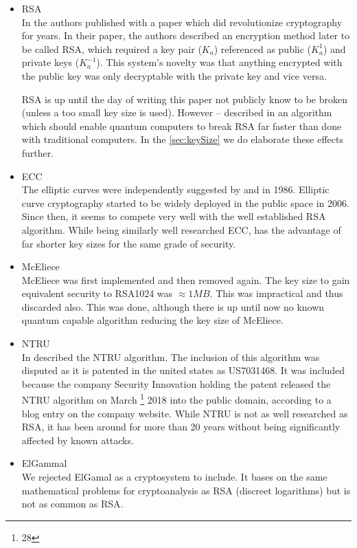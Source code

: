 \begin{itemize}
	\item RSA\\
	In \citeyear{Rivest:1978:MOD:359340.359342} the authors \citeauthor{Rivest:1978:MOD:359340.359342} published with \cite{Rivest:1978:MOD:359340.359342} a paper which did revolutionize cryptography for years. In their paper, the authors described an encryption method later to be called RSA, which required a key pair ($K_a$) referenced as public ($K^{1}_a$) and private keys ($K^{-1}_a$). This system's novelty was that anything encrypted with the public key was only decryptable with the private key and vice versa.
	
	RSA is up until the day of writing this paper not publicly know to be broken (unless a too small key size is used). However -- \citeauthor{Shor97polynomial-timealgorithms} described in \citeyear{Shor97polynomial-timealgorithms} an algorithm which should enable quantum computers to break RSA far faster than done with traditional computers. In the \cref{sec:keySize} we do elaborate these effects further.
	\item ECC\\
	The elliptic curves were independently suggested by \cite{Miller1986} and \cite{Koblitz04guideto} in 1986. Elliptic curve cryptography started to be widely deployed in the public space in 2006. Since then, it seems to compete very well with the well established RSA algorithm. While being similarly well researched ECC, has the advantage of far shorter key sizes for the same grade of security.
	\item McEliece\\
	McEliece was first implemented and then removed again. The key size to gain equivalent security to RSA1024 was $\approx 1MB$. This was impractical and thus discarded also. This was done, although there is up until now no known quantum capable algorithm reducing the key size of McEliece.
	\item NTRU\\
	In \cite{Hoffstein1998} \citeauthor{Hoffstein1998} described the NTRU algorithm. The inclusion of this algorithm was disputed as it is patented in the united states as US7031468. It was included because the company Security Innovation holding the patent released the NTRU algorithm on March \thanks{28} 2018 into the public domain, according to a blog entry on the company website. While NTRU is not as well researched as RSA, it has been around for more than 20 years without being significantly affected by known attacks.
	\item ElGammal\\
	We rejected ElGamal as a cryptosystem to include. It bases on the same mathematical problems for cryptoanalysis as RSA (discreet logarithms) but is not as common as RSA.
\end{itemize}



